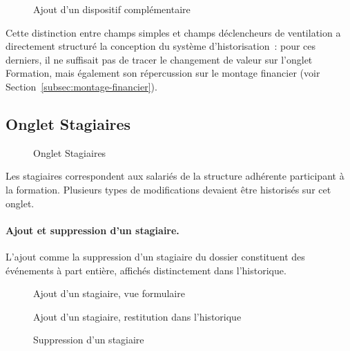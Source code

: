 \begin{figure}[H]
  \centering
  \caption{Ajout d'un dispositif complémentaire}
  \label{fig:ajout-dispositif}
\end{figure}

Cette distinction entre champs \og{}simples\fg{} et champs déclencheurs
de ventilation a directement structuré la conception du système
d'historisation~: pour ces derniers, il ne suffisait pas de tracer le
changement de valeur sur l'onglet Formation, mais également son
répercussion sur le montage financier (voir
Section~\ref{subsec:montage-financier}).

\subsection{Onglet Stagiaires}

\begin{figure}[H]
  \centering
  \caption{Onglet Stagiaires}
  \label{fig:onglet-stagiaires}
\end{figure}

Les stagiaires correspondent aux salariés de la structure adhérente
participant à la formation. Plusieurs types de modifications devaient
être historisés sur cet onglet.

\paragraph{Ajout et suppression d'un stagiaire.}
L'ajout comme la suppression d'un stagiaire du dossier constituent des
événements à part entière, affichés distinctement dans l'historique.

\begin{figure}[H]
  \centering
  \caption{Ajout d'un stagiaire, vue formulaire}
  \label{fig:ajout-stagiaire}
\end{figure}

\begin{figure}[H]
  \centering
  \caption{Ajout d'un stagiaire, restitution dans l'historique}
  \label{fig:ajout-stagiaire-hist}
\end{figure}

\begin{figure}[H]
  \centering
  \caption{Suppression d'un stagiaire}
  \label{fig:suppression-stagiaire}
\end{figure}

